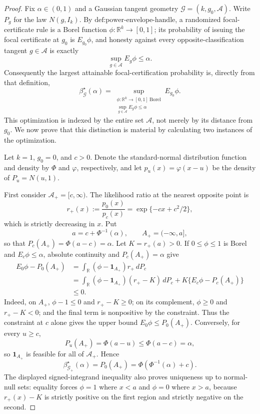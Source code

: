 \documentclass{article}
\begin{document}
\begin{proof}
Fix \(\alpha\in(0,1)\) and a Gaussian tangent geometry \(\mathcal G=(k,g_0,\mathcal A)\).  Write \(P_g\) for the law \(N(g,I_k)\).  By \(\text{def:power-envelope-handle}\), a randomized focal-certificate rule is a Borel function \(\phi:\mathbb R^k\to[0,1]\); its probability of issuing the focal certificate at \(g_0\) is \(E_{g_0}\phi\), and honesty against every opposite-classification tangent \(g\in\mathcal A\) is exactly
\[
 \sup_{g\in\mathcal A}E_g\phi\leq\alpha.
\]
Consequently the largest attainable focal-certification probability is, directly from that definition,
\[
 \beta^{\star}_{\mathcal G}(\alpha)
 =\sup_{\substack{\phi:\mathbb R^k\to[0,1]\ \mathrm{Borel}\\
                    \sup_{g\in\mathcal A}E_g\phi\leq\alpha}}
   E_{g_0}\phi.
\]
This optimization is indexed by the entire set \(\mathcal A\), not merely by its distance from \(g_0\).  We now prove that this distinction is material by calculating two instances of the optimization.

Let \(k=1\), \(g_0=0\), and \(c>0\).  Denote the standard-normal distribution function and density by \(\Phi\) and \(\varphi\), respectively, and let \(p_u(x)=\varphi(x-u)\) be the density of \(P_u=N(u,1)\).

First consider \(\mathcal A_+=[c,\infty)\).  The likelihood ratio at the nearest opposite point is
\[
 r_+(x):=\frac{p_0(x)}{p_c(x)}
 =\exp\{-cx+c^2/2\},
\]
which is strictly decreasing in \(x\).  Put
\[
 a=c+\Phi^{-1}(\alpha),\qquad A_+=(-\infty,a],
\]
so that \(P_c(A_+)=\Phi(a-c)=\alpha\).  Let \(K=r_+(a)>0\).  If \(0\leq\phi\leq1\) is Borel and \(E_c\phi\leq\alpha\), absolute continuity and \(P_c(A_+)=\alpha\) give
\[
 \begin{aligned}
 E_0\phi-P_0(A_+)
 &=\int_{\mathbb R}(\phi-\mathbf 1_{A_+})r_+\,dP_c\\
 &=\int_{\mathbb R}(\phi-\mathbf 1_{A_+})(r_+-K)\,dP_c
   +K\{E_c\phi-P_c(A_+)\}\\
 &\leq0.
 \end{aligned}
\]
Indeed, on \(A_+\), \(\phi-1\leq0\) and \(r_+-K\geq0\); on its complement, \(\phi\geq0\) and \(r_+-K<0\); and the final term is nonpositive by the constraint.  Thus the constraint at \(c\) alone gives the upper bound \(E_0\phi\leq P_0(A_+)\).  Conversely, for every \(u\geq c\),
\[
 P_u(A_+)=\Phi(a-u)\leq\Phi(a-c)=\alpha,
\]
so \(\mathbf 1_{A_+}\) is feasible for all of \(\mathcal A_+\).  Hence
\[
 \beta^{\star}_{\mathcal G_+}(\alpha)
 =P_0(A_+)
 =\Phi\!\left(\Phi^{-1}(\alpha)+c\right).
\]
The displayed signed-integrand inequality also proves uniqueness up to normal-null sets: equality forces \(\phi=1\) where \(x<a\) and \(\phi=0\) where \(x>a\), because \(r_+(x)-K\) is strictly positive on the first region and strictly negative on the second.


\end{proof}
\end{document}
